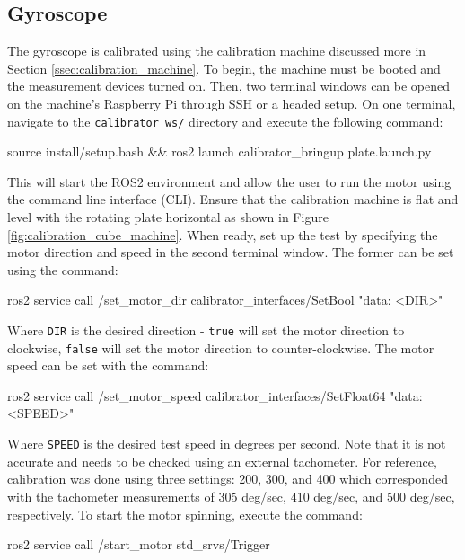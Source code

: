 \subsection{Gyroscope}
The gyroscope is calibrated using the calibration machine discussed more in Section \ref{ssec:calibration_machine}.
To begin, the machine must be booted and the measurement devices turned on.
Then, two terminal windows can be opened on the machine's Raspberry Pi through SSH or a headed setup.
On one terminal, navigate to the \lstinline[style=customInline]|calibrator_ws/| directory and execute the following command:

\begin{bash}
    source install/setup.bash && ros2 launch calibrator_bringup plate.launch.py
\end{bash}

\noindent This will start the ROS2 environment and allow the user to run the motor using the command line interface (CLI).
Ensure that the calibration machine is flat and level with the rotating plate horizontal as shown in Figure \ref{fig:calibration_cube_machine}.
When ready, set up the test by specifying the motor direction and speed in the second terminal window.
The former can be set using the command:

\begin{bash}
    ros2 service call /set_motor_dir calibrator_interfaces/SetBool "{data: <DIR>}"
\end{bash}

\noindent Where \lstinline[style=customInline]|DIR| is the desired direction - \lstinline[style=customInline]|true| will set the motor direction to clockwise, \lstinline[style=customInline]|false| will set the motor direction to counter-clockwise.
The motor speed can be set with the command:

\begin{bash}
    ros2 service call /set_motor_speed calibrator_interfaces/SetFloat64 "{data: <SPEED>}"
\end{bash}

\noindent Where \lstinline[style=customInline]|SPEED| is the desired test speed in degrees per second.
Note that it is not accurate and needs to be checked using an external tachometer.
For reference, calibration was done using three settings: 200, 300, and 400 which corresponded with the tachometer measurements of 305 deg/sec, 410 deg/sec, and 500 deg/sec, respectively.
To start the motor spinning, execute the command:

\begin{bash}
    ros2 service call /start_motor std_srvs/Trigger
\end{bash}

